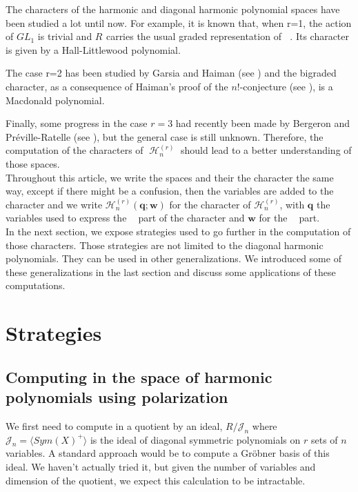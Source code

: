 \documentclass[letter,12pt]{article}
\DeclareMathOperator{\Sn}{\mathbb{S}_n}
\DeclareMathOperator{\GLr}{GL_r}
\DeclareMathOperator{\harmonics}{\mathcal{H}}
\begin{document}
   	
   	The characters of the harmonic and diagonal harmonic polynomial spaces have been studied a lot until now. For example, it is known that, when r=1, the action of $GL_1$ is trivial and $R_{\Sn}$ carries the usual graded representation of $\Sn$. Its character is given by a Hall-Littlewood polynomial.
   	
    The case r=2 has been studied by Garsia and Haiman (see \cite{GarsiaHaiman1993}) and the bigraded character, as a consequence of Haiman's proof of the $n!$-conjecture (see \cite{Haiman2002}), is a Macdonald polynomial.
    
	Finally, some progress in the case $r=3$ had recently been made by Bergeron and Préville-Ratelle (see \cite{BergeronPreville2012}), but the general case is still unknown. Therefore, the computation of the characters of $\harmonics_{n}^{(r)}$ should lead to a better understanding of those spaces. \\
	
	Throughout this article, we write the spaces and their the character the same way, except if there might be a confusion, then the variables are added to the character and we write $\mathcal{H}_n^{(r)}(\bm{q};\bm{w})$ for the character of $\mathcal{H}_n^{(r)}$,  with $\bm{q}$ the variables used to express the $\GLr$ part of the character and $\bm{w}$ for the $\Sn$ part.\\
	
	In the next section, we expose strategies used to go further in the computation of those characters. Those strategies are not limited to the diagonal harmonic polynomials. They can be used in other generalizations. We introduced some of these generalizations in the last section and discuss some applications of these computations.
	 
	
	\section{Strategies}
	
	\subsection{Computing in the space of harmonic polynomials using polarization}
	
	We first need to compute in a quotient by an ideal, $R / \mathcal{J}_n$ where $\mathcal{J}_n = \langle Sym(X)^+ \rangle$ is the ideal of diagonal symmetric polynomials on $r$ sets of $n$ variables.
	A standard approach would be to compute a Gröbner basis of this ideal.
	We haven't actually tried it, but given the number of variables and dimension of the quotient, we expect this calculation to be intractable.
	
\end{document}
